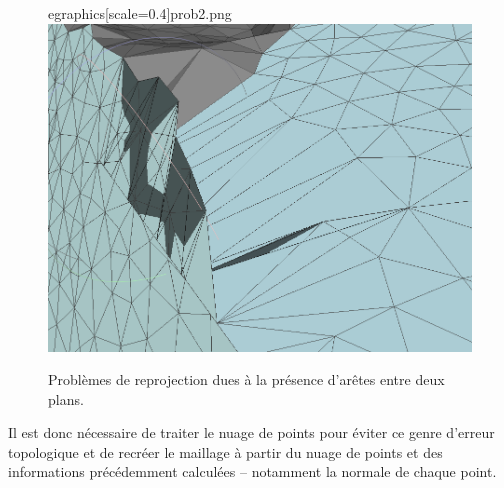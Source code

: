 \documentclass[12pt, twoside]{article}
\begin{document}
\begin{figure}[h]
egraphics[scale=0.4]{prob2.png} \includegraphics[scale=0.25]{prob3.png}
\caption{\label{fig:probproj} Problèmes de reprojection dues à la présence d'arêtes entre deux plans.}
\end{figure}

Il est donc nécessaire de traiter le nuage de points pour éviter ce genre d'erreur topologique et de recréer le maillage à partir du nuage de points et des informations précédemment calculées -- notamment la normale de chaque point.
\end{document}
